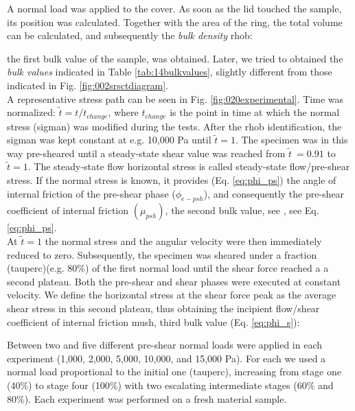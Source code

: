 A normal load was applied to the cover. As soon as the lid touched the sample,
its position was calculated.
Together with the area of the ring, the total volume can be calculated, and subsequently the 
\textit{bulk density} \acs{rhob}:


the first bulk value
of the sample, was obtained.
Later, we tried to obtained the \textit{bulk values} indicated in Table
\ref{tab:14bulkvalues}, slightly different from those indicated in Fig.
\ref{fig:002srsctdiagram}.\\
A representative stress path can be seen in Fig. \ref{fig:020experimental}.
Time was normalized: $\tilde{t} = t/t_{change}$, where $t_{change}$ is the
point in time at which the normal stress (\acs{sigman}) was modified during the	tests.
After the \acs{rhob} identification, the \acs{sigman} was kept constant at e.g.
10,000 Pa until $\tilde{t}=1$.
The specimen was in this way pre-sheared until a steady-state shear value was
reached from $\tilde{t}~=0.91$ to $\tilde{t}=1$.
The steady-state flow horizontal stress
is called steady-state flow/pre-shear stress.
If the normal stress is known, it provides (Eq. \ref{eq:phi_ps}) the angle of
internal friction of the pre-shear phase ($\phi_{e-psh}$), and consequently the
pre-shear coefficient of internal friction $ (\mu_{psh})$, the second
bulk value, see \citet{RefWorks:118}, see Eq. \ref{eq:phi_ps}.\\
At $\tilde{t}=1$ the normal stress and the angular velocity were then
immediately reduced to zero.
Subsequently, the specimen was sheared under a fraction (\acs{tauperc})(e.g.
80\%) of the first normal load until the shear force reached a a second plateau.
Both the pre-shear and shear phases were executed at constant velocity. 
We define the horizontal stress at the shear force peak as the average shear
stress in this second plateau, thus obtaining the incipient flow/shear
coefficient of internal friction \acs{mush}, third bulk value (Eq. \ref{eq:phi_s})\cite{RefWorks:118}:

Between two and five different pre-shear normal loads were applied in each
experiment (1,000, 2,000, 5,000, 10,000, and 15,000 Pa).
For each we used a normal load proportional to the initial one
(\acs{tauperc}), increasing from stage one (40\%) to stage four (100\%)
with two escalating intermediate stages (60\% and 80\%).
Each experiment was performed on a fresh material sample. \\

